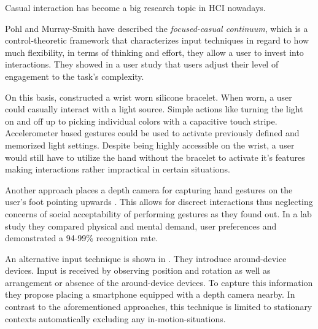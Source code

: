 Casual interaction has become a big research topic in \ac{HCI} nowadays.

Pohl and Murray-Smith \cite{pohl2013focused} have described the \textit{focused-casual continuum}, which is a control-theoretic framework that characterizes input techniques in regard to how much flexibility, in terms of thinking and effort, they allow a user to invest into interactions. They showed in a user study that users adjust their level of engagement to the task's complexity.

On this basis, \cite{Busse2014Thesis} constructed a wrist worn silicone bracelet. When worn, a user could casually interact with a light source. Simple actions like turning the light on and off up to picking individual colors with a capacitive touch stripe. Accelerometer based gestures could be used to activate previously defined and memorized light settings. Despite being highly accessible on the wrist, a user would still have to utilize the hand without the bracelet to activate it's features making interactions rather impractical in certain situations.

Another approach places a depth camera for capturing hand gestures on the user's foot pointing upwards \cite{bailly2012shoesense}. This allows for discreet interactions thus neglecting concerns of social acceptability of performing gestures as they found out. In a lab study they compared physical and mental demand, user preferences and demonstrated a 94-99\% recognition rate.

An alternative input technique is shown in \cite{pohl2014around}. They introduce around-device devices. Input is received by observing position and rotation as well as arrangement or absence of the around-device devices. To capture this information they propose placing a smartphone equipped with a depth camera nearby.  In contrast to the aforementioned approaches, this technique is limited to stationary contexts automatically excluding any in-motion-situations.







